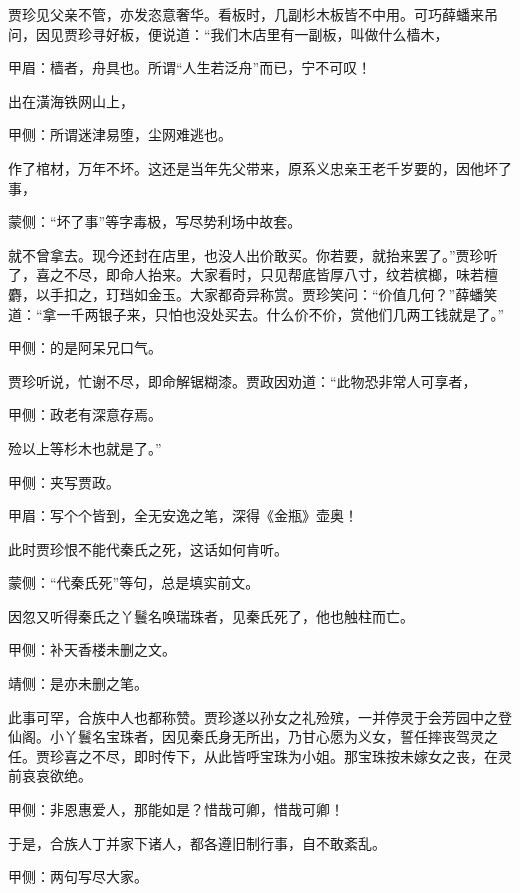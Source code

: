 \begin{parag}
    贾珍见父亲不管，亦发恣意奢华。看板时，几副杉木板皆不中用。可巧薛蟠来吊问，因见贾珍寻好板，便说道：“我们木店里有一副板，叫做什么樯木，\begin{note}甲眉：樯者，舟具也。所谓“人生若泛舟”而已，宁不可叹！\end{note}出在潢海铁网山上，\begin{note}甲侧：所谓迷津易堕，尘网难逃也。\end{note}作了棺材，万年不坏。这还是当年先父带来，原系义忠亲王老千岁要的，因他坏了事，\begin{note}蒙侧：“坏了事”等字毒极，写尽势利场中故套。\end{note}就不曾拿去。现今还封在店里，也没人出价敢买。你若要，就抬来罢了。”贾珍听了，喜之不尽，即命人抬来。大家看时，只见帮底皆厚八寸，纹若槟榔，味若檀麝，以手扣之，玎珰如金玉。大家都奇异称赏。贾珍笑问：“价值几何？”薛蟠笑道：“拿一千两银子来，只怕也没处买去。什么价不价，赏他们几两工钱就是了。”\begin{note}甲侧：的是阿呆兄口气。\end{note}贾珍听说，忙谢不尽，即命解锯糊漆。贾政因劝道：“此物恐非常人可享者，\begin{note}甲侧：政老有深意存焉。\end{note}殓以上等杉木也就是了。”\begin{note}甲侧：夹写贾政。\end{note}\begin{note}甲眉：写个个皆到，全无安逸之笔，深得《金瓶》壶奥！\end{note}此时贾珍恨不能代秦氏之死，这话如何肯听。\begin{note}蒙侧：“代秦氏死”等句，总是填实前文。\end{note}
\end{parag}


\begin{parag}
    因忽又听得秦氏之丫鬟名唤瑞珠者，见秦氏死了，他也触柱而亡。\begin{note}甲侧：补天香楼未删之文。\end{note}\begin{note}靖侧：是亦未删之笔。\end{note}此事可罕，合族中人也都称赞。贾珍遂以孙女之礼殓殡，一并停灵于会芳园中之登仙阁。小丫鬟名宝珠者，因见秦氏身无所出，乃甘心愿为义女，誓任摔丧驾灵之任。贾珍喜之不尽，即时传下，从此皆呼宝珠为小姐。那宝珠按未嫁女之丧，在灵前哀哀欲绝。\begin{note}甲侧：非恩惠爱人，那能如是？惜哉可卿，惜哉可卿！\end{note}于是，合族人丁并家下诸人，都各遵旧制行事，自不敢紊乱。\begin{note}甲侧：两句写尽大家。\end{note}
\end{parag}


